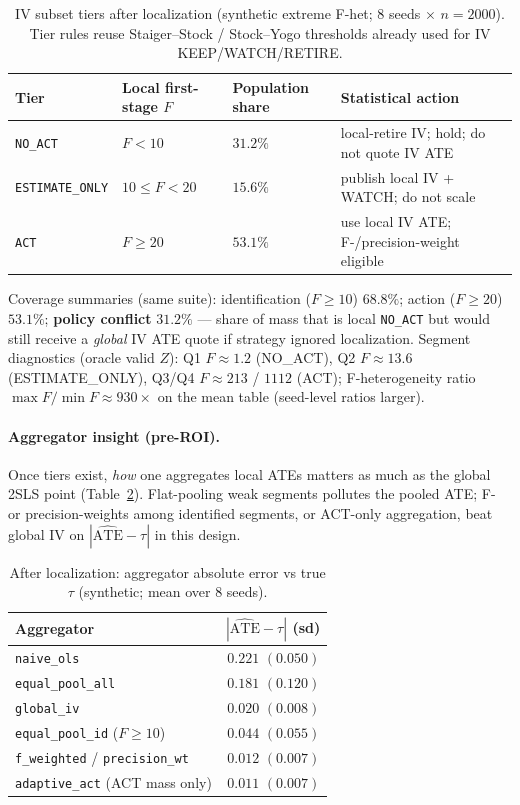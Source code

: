 \documentclass{article}
\begin{document}
\begin{table}[H]
\centering
\small
\caption{IV subset tiers after localization (synthetic extreme F-het;
8 seeds $\times$ $n{=}2000$). Tier rules reuse Staiger--Stock / Stock--Yogo
thresholds already used for IV KEEP/WATCH/RETIRE.}
\label{tab:iv-tiers}
\begin{tabular}{@{}llll@{}}
\toprule
Tier & Local first-stage $F$ & Population share & Statistical action \\
\midrule
\texttt{NO\_ACT} & $F<10$ & $31.2\%$ & local-retire IV; hold; do not quote IV ATE \\
\texttt{ESTIMATE\_ONLY} & $10\le F<20$ & $15.6\%$ & publish local IV + WATCH; do not scale \\
\texttt{ACT} & $F\ge 20$ & $53.1\%$ & use local IV ATE; F-/precision-weight eligible \\
\bottomrule
\end{tabular}
\end{table}

\noindent Coverage summaries (same suite): identification ($F\ge 10$)
$68.8\%$; action ($F\ge 20$) $53.1\%$;
\textbf{policy conflict} $31.2\%$ --- share of mass that is local
\texttt{NO\_ACT} but would still receive a \emph{global} IV ATE quote if
strategy ignored localization.
Segment diagnostics (oracle valid $Z$): Q1 $F\approx 1.2$ (NO\_ACT),
Q2 $F\approx 13.6$ (ESTIMATE\_ONLY), Q3/Q4 $F\approx 213$ / $1112$ (ACT);
F-heterogeneity ratio $\max F/\min F \approx 930\times$ on the mean table
(seed-level ratios larger).

\paragraph{Aggregator insight (pre-ROI).}
Once tiers exist, \emph{how} one aggregates local ATEs matters as much as
the global 2SLS point (Table~\ref{tab:iv-agg}).
Flat-pooling weak segments pollutes the pooled ATE; F- or precision-weights
among identified segments, or ACT-only aggregation, beat global IV on
$|\widehat{\mathrm{ATE}}-\tau|$ in this design.

\begin{table}[H]
\centering
\small
\caption{After localization: aggregator absolute error vs true $\tau$
(synthetic; mean over 8 seeds).}
\label{tab:iv-agg}
\begin{tabular}{@{}lr@{}}
\toprule
Aggregator & $|\widehat{\mathrm{ATE}}-\tau|$ (sd) \\
\midrule
\texttt{naive\_ols} & $0.221$ $(0.050)$ \\
\texttt{equal\_pool\_all} & $0.181$ $(0.120)$ \\
\texttt{global\_iv} & $0.020$ $(0.008)$ \\
\texttt{equal\_pool\_id} ($F\ge 10$) & $0.044$ $(0.055)$ \\
\texttt{f\_weighted} / \texttt{precision\_wt} & $\mathbf{0.012}$ $(0.007)$ \\
\texttt{adaptive\_act} (ACT mass only) & $\mathbf{0.011}$ $(0.007)$ \\
\bottomrule
\end{tabular}
\end{table}
\end{document}
